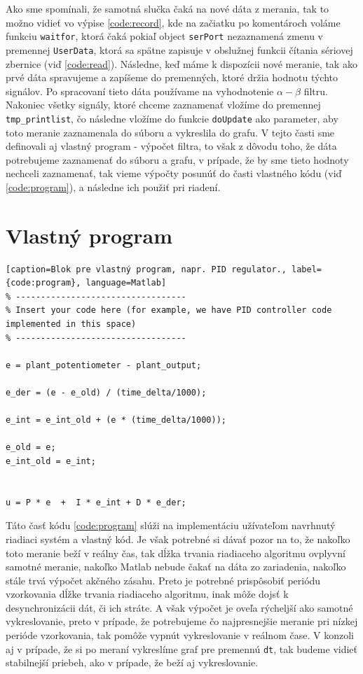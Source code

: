 \documentclass[a4paper, 10pt, ]{article}
\begin{document}
Ako sme spomínali, že samotná slučka čaká na nové dáta z merania, tak to možno vidieť vo výpise \ref{code:record}, kde na začiatku po komentároch voláme funkciu \texttt{waitfor}, ktorá čaká pokiaľ object \texttt{serPort} nezaznamená zmenu v premennej \texttt{UserData}, ktorá sa spätne zapisuje v obslužnej funkcii čítania sériovej zbernice (viď \ref{code:read}). Následne, keď máme k dispozícii nové meranie, tak ako prvé dáta spravujeme a zapíšeme do premenných, ktoré držia hodnotu týchto signálov. Po spracovaní tieto dáta používame na vyhodnotenie $\alpha-\beta$ filtru. Nakoniec všetky signály, ktoré chceme zaznamenať vložíme do premennej \texttt{tmp\_printlist}, čo následne vložíme do funkcie \texttt{doUpdate} ako parameter, aby toto meranie zaznamenala do súboru a vykreslila do grafu. V tejto časti sme definovali aj vlastný program - výpočet filtra, to však z dôvodu toho, že dáta potrebujeme zaznamenať do súboru a grafu, v prípade, že by sme tieto hodnoty nechceli zaznamenať, tak vieme výpočty posunúť do časti vlastného kódu (viď \ref{code:program}), a následne ich použiť pri riadení.

\section{Vlastný program}
\begin{lstlisting}[caption=Blok pre vlastný program, napr. PID regulator., label={code:program}, language=Matlab]
% ----------------------------------
% Insert your code here (for example, we have PID controller code implemented in this space)
% ----------------------------------

e = plant_potentiometer - plant_output;

e_der = (e - e_old) / (time_delta/1000);

e_int = e_int_old + (e * (time_delta/1000));

e_old = e;
e_int_old = e_int;


u = P * e  +  I * e_int + D * e_der;
\end{lstlisting}

Táto časť kódu \ref{code:program} slúži na implementáciu užívateľom navrhnutý riadiaci systém a vlastný kód. Je však potrebné si dávať pozor na to, že nakoľko toto meranie beží v reálny čas, tak dĺžka trvania riadiaceho algoritmu ovplyvní samotné meranie, nakoľko Matlab nebude čakať na dáta zo zariadenia, nakoľko stále trvá výpočet akčného zásahu. Preto je potrebné prispôsobiť periódu vzorkovania dĺžke trvania riadiaceho algoritmu, inak môže dojsť k desynchronizácii dát, či ich stráte. A však výpočet je oveľa rýcheljší ako samotné vykreslovanie, preto v prípade, že potrebujeme čo najpresnejšie meranie pri nízkej perióde vzorkovania, tak pomôže vypnút vykreslovanie v reálnom čase. V konzoli aj v prípade, že si po meraní vykreslíme graf pre premennú \texttt{dt}, tak budeme vidieť stabilnejší priebeh, ako v prípade, že beží aj vykreslovanie.
\end{document}

